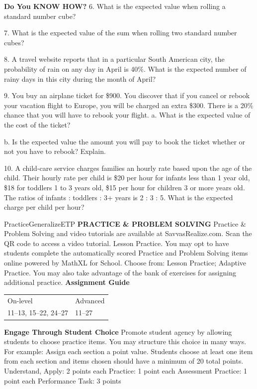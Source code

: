 \documentclass{article}
\newenvironment{concept-summary}{}{}    %
\newenvironment{te-addendum}[2]{}{}     %
\newcommand{\answer}[1]{}               %
\newcommand{\te}[1]{}                   %
\begin{document}
\begin{concept-summary}
\textbf{Do You KNOW HOW?}
6. What is the expected value when rolling a standard number cube?
\answer{3.5}
7. What is the expected value of the sum when rolling two standard number cubes?
\answer{7}
8. A travel website reports that in a particular South American city, the probability of rain on any day in April is 40\%. What is the expected number of rainy days in this city during the month of April?
\answer{12}
9. You buy an airplane ticket for \$900. You discover that if you cancel or rebook your vacation flight to Europe, you will be charged an extra \$300. There is a 20\% chance that you will have to rebook your flight.
a. What is the expected value of the cost of the ticket?
\answer{a. \$960}
b. Is the expected value the amount you will pay to book the ticket whether or not you have to rebook? Explain.
\answer{b. No; 80\% of the time you would expect to pay \$900, and 20\% of the time you would expect to pay (\$900+\$300=\$1,200). The expected value tells you the average cost if you were booking many such flights.}
10. A child-care service charges families an hourly rate based upon the age of the child. Their hourly rate per child is \$20 per hour for infants less than 1 year old, \$18 for toddlers 1 to 3 years old, \$15 per hour for children 3 or more years old. The ratios of infants : toddlers : 3+ years is 2 : 3 : 5. What is the expected charge per child per hour?
\answer{\$16.90}
\te{Printed age groups overlap at 3 years; likely toddlers are younger than 3. Student preview footer prints 538, teacher footer 620.}
\end{concept-summary}
\begin{te-addendum}{Practice}{GeneralizeETP}
\textbf{PRACTICE \& PROBLEM SOLVING}
Practice \& Problem Solving and video tutorials are available at SavvasRealize.com.
Scan the QR code to access a video tutorial.
Lesson Practice. You may opt to have students complete the automatically scored Practice and Problem Solving items online powered by MathXL for School.
Choose from: Lesson Practice; Adaptive Practice.
You may also take advantage of the bank of exercises for assigning additional practice.
\textbf{Assignment Guide}
\begin{tabular}{ll}
On-level & Advanced \\
11--13, 15--22, 24--27 & 11--27 \\
\end{tabular}
\textbf{Engage Through Student Choice}
Promote student agency by allowing students to choose practice items.
You may structure this choice in many ways.
For example: Assign each section a point value. Students choose at least one item from each section and items chosen should have a minimum of 20 total points.
Understand, Apply: 2 points each
Practice: 1 point each
Assessment Practice: 1 point each
Performance Task: 3 points
\end{te-addendum}
\end{document}
